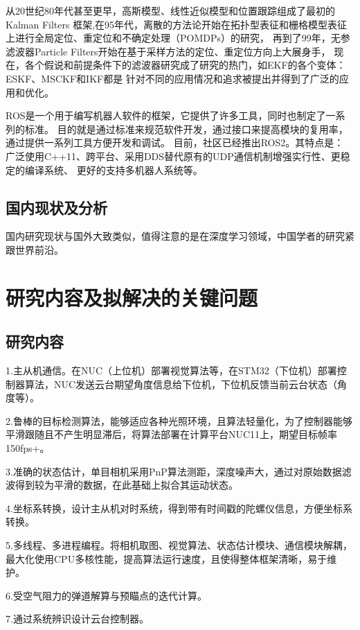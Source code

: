 从20世纪80年代甚至更早，高斯模型、线性近似模型和位置跟踪组成了最初的Kalman Filters\cite{welch1995introduction, fujii2013extended, liu2011unscented}
框架,在95年代，离散的方法论开始在拓扑型表征和栅格模型表征上进行全局定位、重定位和不确定处理（POMDPs）的研究，
再到了99年，无参滤波器Particle Filters\cite{chen2003bayesian, gustafsson2002particle}开始在基于采样方法的定位、重定位方向上大展身手，
现在，各个假说和前提条件下的滤波器研究成了研究的热门，如EKF的各个变体：ESKF、MSCKF和IKF都是
针对不同的应用情况和追求被提出并得到了广泛的应用和优化。

ROS是一个用于编写机器人软件的框架，它提供了许多工具，同时也制定了一系列的标准。
目的就是通过标准来规范软件开发，通过接口来提高模块的复用率，通过提供一系列工具方便开发和调试。
目前，社区已经推出ROS2。其特点是：
广泛使用C++11、跨平台、采用DDS替代原有的UDP通信机制增强实行性、更稳定的编译系统、
更好的支持多机器人系统等。


\subsection{国内现状及分析}
国内研究现状与国外大致类似，值得注意的是在深度学习领域，中国学者的研究紧跟世界前沿。
\section{研究内容及拟解决的关键问题}
\subsection{研究内容}
1.主从机通信。在NUC（上位机）部署视觉算法等，在STM32（下位机）部署控制器算法，NUC发送云台期望角度信息给下位机，下位机反馈当前云台状态（角度等）。\par
2.鲁棒的目标检测算法，能够适应各种光照环境，且算法轻量化，为了控制器能够平滑跟随且不产生明显滞后，将算法部署在计算平台NUC11上，期望目标帧率150fps+。 \par
3.准确的状态估计，单目相机采用PnP算法测距，深度噪声大，通过对原始数据滤波得到较为平滑的数据，在此基础上拟合其运动状态。 \par
4.坐标系转换，设计主从机对时系统，得到带有时间戳的陀螺仪信息，方便坐标系转换。 \par
5.多线程、多进程编程。将相机取图、视觉算法、状态估计模块、通信模块解耦，最大化使用CPU多核性能，提高算法运行速度，且使得整体框架清晰，易于维护。\par
6.受空气阻力的弹道解算与预瞄点的迭代计算。\par
7.通过系统辨识设计云台控制器。\par
